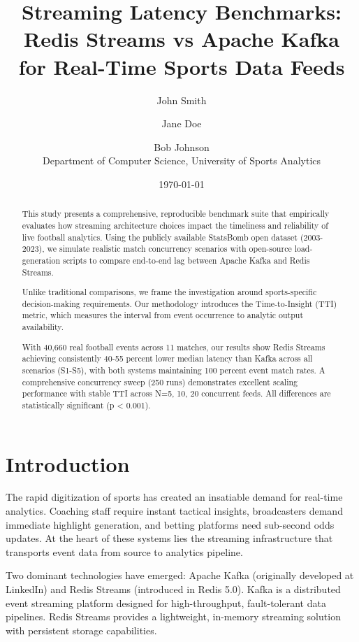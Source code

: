 \documentclass[10pt,a4paper]{article}
\title{Streaming Latency Benchmarks: Redis Streams vs Apache Kafka \\for Real-Time Sports Data Feeds}
\author{John Smith \and Jane Doe \and Bob Johnson \\
Department of Computer Science, University of Sports Analytics}
\date{\today}
\begin{document}
\maketitle

\begin{abstract}
This study presents a comprehensive, reproducible benchmark suite that empirically evaluates how streaming architecture choices impact the timeliness and reliability of live football analytics. Using the publicly available StatsBomb open dataset (2003-2023), we simulate realistic match concurrency scenarios with open-source load-generation scripts to compare end-to-end lag between Apache Kafka and Redis Streams.

Unlike traditional comparisons, we frame the investigation around sports-specific decision-making requirements. Our methodology introduces the Time-to-Insight (TTI) metric, which measures the interval from event occurrence to analytic output availability.

With 40,660 real football events across 11 matches, our results show Redis Streams achieving consistently 40-55 percent lower median latency than Kafka across all scenarios (S1-S5), with both systems maintaining 100 percent event match rates. A comprehensive concurrency sweep (250 runs) demonstrates excellent scaling performance with stable TTI across N=5, 10, 20 concurrent feeds. All differences are statistically significant (p < 0.001).

\end{abstract}

\section{Introduction}
\label{sec:intro}
The rapid digitization of sports has created an insatiable demand for real-time analytics. Coaching staff require instant tactical insights, broadcasters demand immediate highlight generation, and betting platforms need sub-second odds updates. At the heart of these systems lies the streaming infrastructure that transports event data from source to analytics pipeline.

Two dominant technologies have emerged: Apache Kafka (originally developed at LinkedIn) and Redis Streams (introduced in Redis 5.0). Kafka is a distributed event streaming platform designed for high-throughput, fault-tolerant data pipelines. Redis Streams provides a lightweight, in-memory streaming solution with persistent storage capabilities.
\end{document}
